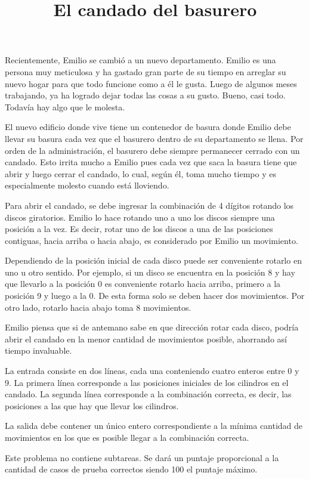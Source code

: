 \documentclass{oci}
\title{El candado del basurero}
\begin{document}
\begin{problemDescription}
  Recientemente, Emilio se cambió a un nuevo departamento.
  Emilio es una persona muy meticulosa y ha gastado gran parte de su tiempo en arreglar su
  nuevo hogar para que todo funcione como a él le gusta.
  Luego de algunos meses trabajando, ya ha logrado dejar todas las cosas a su gusto.
  Bueno, casi todo.
  Todavía hay algo que le molesta.

  El nuevo edificio donde vive tiene un contenedor de basura donde Emilio
  debe llevar su basura cada vez que el basurero dentro de su departamento se llena.
  Por orden de la administración, el basurero debe siempre permanecer cerrado con un
  candado.
  Esto irrita mucho a Emilio pues cada vez que saca la basura tiene que abrir y luego cerrar
  el candado, lo cual, según él, toma mucho tiempo y es especialmente molesto cuando está lloviendo.

  Para abrir el candado, se debe ingresar la combinación de 4 dígitos rotando los discos
  giratorios.
  Emilio lo hace rotando uno a uno los discos siempre una posición a la vez.
  Es decir, rotar uno de los discos a una de las posiciones contiguas, hacia arriba o hacia abajo, es
  considerado por Emilio un movimiento.

  Dependiendo de la posición inicial de cada disco puede ser conveniente rotarlo en uno u otro
  sentido.
  Por ejemplo, si un disco se encuentra en la posición 8 y hay que llevarlo a la posición 0 es
  conveniente rotarlo hacia arriba, primero a la posición 9 y luego a la 0.
  De esta forma solo se deben hacer dos movimientos.
  Por otro lado, rotarlo hacia abajo toma 8 movimientos.

  Emilio piensa que si de antemano sabe en que dirección rotar cada disco, podría abrir el candado en
  la menor cantidad de movimientos posible, ahorrando así tiempo invaluable.
\end{problemDescription}

\begin{inputDescription}
  La entrada consiste en dos líneas, cada una conteniendo cuatro enteros entre 0 y 9.
  La primera línea corresponde a las posiciones iniciales de los cilindros en el candado.
  La segunda línea corresponde a la combinación correcta, es decir, las posiciones a las
  que hay que llevar los cilindros.
\end{inputDescription}

\begin{outputDescription}
  La salida debe contener un único entero correspondiente a la mínima cantidad de movimientos en los
  que es posible llegar a la combinación correcta.
\end{outputDescription}

\begin{scoreDescription}
  Este problema no contiene subtareas. Se dará un puntaje proporcional a la cantidad de casos de
  prueba correctos siendo 100 el puntaje máximo.
\end{scoreDescription}

\begin{sampleDescription}
\end{sampleDescription}
\end{document}
